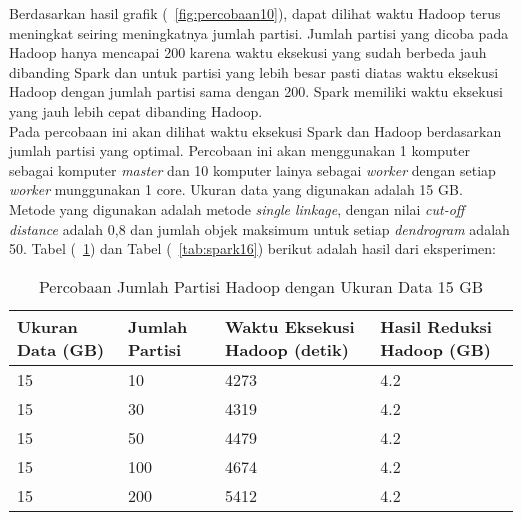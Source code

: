 Berdasarkan hasil grafik (~\ref{fig:percobaan10}), dapat dilihat waktu Hadoop terus meningkat seiring meningkatnya jumlah partisi. Jumlah partisi yang dicoba pada Hadoop hanya mencapai 200 karena waktu eksekusi yang sudah berbeda jauh dibanding Spark dan untuk partisi yang lebih besar pasti diatas waktu eksekusi Hadoop dengan jumlah partisi sama dengan 200. Spark memiliki waktu eksekusi yang jauh lebih cepat dibanding Hadoop.\\





Pada percobaan ini akan dilihat waktu eksekusi Spark dan Hadoop berdasarkan jumlah partisi yang optimal. Percobaan ini akan menggunakan 1 komputer sebagai komputer \textit{master} dan 10 komputer lainya sebagai \textit{worker} dengan setiap \textit{worker} munggunakan 1 core. Ukuran data yang digunakan adalah 15 GB. Metode yang digunakan adalah metode \textit{single linkage}, dengan nilai \textit{cut-off distance} adalah 0,8 dan jumlah objek maksimum untuk setiap \textit{dendrogram} adalah 50. Tabel (~\ref{tab:spark15}) dan Tabel (~\ref{tab:spark16}) berikut adalah hasil dari eksperimen:





\begin{table}[H] 
	\centering 
	\caption{Percobaan Jumlah Partisi Hadoop dengan Ukuran Data 15 GB}
	\label{tab:spark15}
	\begin{tabular}{|p{3cm}|p{3cm}|p{4cm}|p{4cm}|}
\hline
Ukuran Data (GB) & Jumlah Partisi &  Waktu Eksekusi Hadoop (detik) & Hasil Reduksi Hadoop (GB)\\
\hline
15 & 10 & 4273  & 4.2  \\
\hline
15 & 30 & 4319  & 4.2  \\
\hline
15 & 50 & 4479  & 4.2  \\
\hline
15 & 100 & 4674  & 4.2  \\
\hline
15 & 200 & 5412 & 4.2  \\
\hline


\hline

	\end{tabular} 
\end{table}




